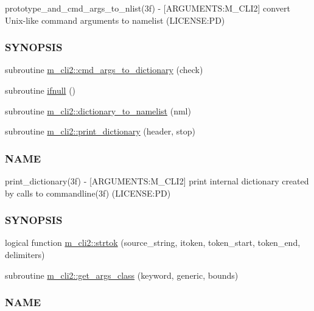 \begin{DoxyCompactItemize}
\begin{DoxyCompactList}
prototype\+\_\+and\+\_\+cmd\+\_\+args\+\_\+to\+\_\+nlist(3f) -\/ \mbox{[}A\+R\+G\+U\+M\+E\+N\+TS\+:M\+\_\+\+C\+L\+I2\mbox{]} convert Unix-\/like command arguments to namelist (L\+I\+C\+E\+N\+SE\+:PD) \subsubsection*{S\+Y\+N\+O\+P\+S\+IS}\end{DoxyCompactList}\item 
subroutine \mbox{\hyperlink{namespacem__cli2_a3348b0c76dadd62c536e06f82bcb0331}{m\+\_\+cli2\+::cmd\+\_\+args\+\_\+to\+\_\+dictionary}} (check)
\item 
subroutine \mbox{\hyperlink{M__CLI2_8f90_aa26f90016621d1ee43d3b5b66316532b}{ifnull}} ()
\item 
subroutine \mbox{\hyperlink{namespacem__cli2_ab43e4e37723a0acc2183fbbf3d8c36bd}{m\+\_\+cli2\+::dictionary\+\_\+to\+\_\+namelist}} (nml)
\item 
subroutine \mbox{\hyperlink{namespacem__cli2_acbd726aa5c13b005a14c06d58915cb9a}{m\+\_\+cli2\+::print\+\_\+dictionary}} (header, stop)
\begin{DoxyCompactList}\small\item\em \subsubsection*{N\+A\+ME}

print\+\_\+dictionary(3f) -\/ \mbox{[}A\+R\+G\+U\+M\+E\+N\+TS\+:M\+\_\+\+C\+L\+I2\mbox{]} print internal dictionary created by calls to commandline(3f) (L\+I\+C\+E\+N\+SE\+:PD) \subsubsection*{S\+Y\+N\+O\+P\+S\+IS}\end{DoxyCompactList}\item 
logical function \mbox{\hyperlink{namespacem__cli2_a752fd074abce57e636e4572b3e55db3a}{m\+\_\+cli2\+::strtok}} (source\+\_\+string, itoken, token\+\_\+start, token\+\_\+end, delimiters)
\item 
subroutine \mbox{\hyperlink{namespacem__cli2_a5ecc06d6d44134b8ef7c71f1eab8aa86}{m\+\_\+cli2\+::get\+\_\+args\+\_\+class}} (keyword, generic, bounds)
\begin{DoxyCompactList}\small\item\em \subsubsection*{N\+A\+ME}


\end{DoxyCompactList}
\end{DoxyCompactItemize}
